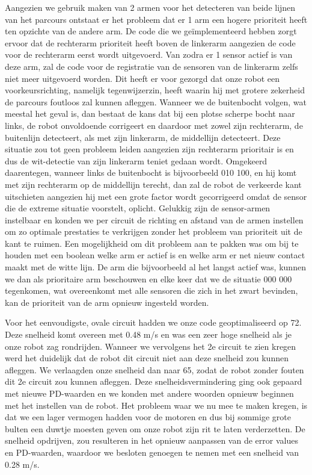 Aangezien we gebruik maken van 2 armen voor het detecteren van beide lijnen van het parcours ontstaat er het probleem dat er 1 arm een hogere prioriteit heeft ten opzichte van de andere arm. De code die we ge\"implementeerd hebben zorgt ervoor dat de rechterarm prioriteit heeft boven de linkerarm aangezien de code voor de rechterarm eerst wordt uitgevoerd. Van zodra er 1 sensor actief is van deze arm, zal de code voor de registratie van de sensoren van de linkerarm zelfs niet meer uitgevoerd worden. Dit heeft er voor gezorgd dat onze robot een voorkeursrichting, namelijk tegenwijzerzin, heeft waarin hij met grotere zekerheid de parcours foutloos zal kunnen afleggen. Wanneer we de buitenbocht volgen, wat meestal het geval is, dan bestaat de kans dat bij een plotse scherpe bocht naar links, de robot onvoldoende corrigeert en daardoor met zowel zijn rechterarm, de buitenlijn detecteert, als met zijn linkerarm, de middellijn detecteert. Deze situatie zou tot geen probleem leiden aangezien zijn rechterarm prioritair is en dus de wit-detectie van zijn linkerarm teniet gedaan wordt. Omgekeerd daarentegen, wanneer links de buitenbocht is bijvoorbeeld 010 100, en hij komt met zijn rechterarm op de middellijn terecht, dan zal de robot de verkeerde kant uitschieten aangezien hij met een grote factor wordt gecorrigeerd omdat de sensor die de extreme situatie voorstelt, oplicht. Gelukkig zijn de sensor-armen instelbaar en konden we per circuit de richting en afstand van de armen instellen om zo optimale prestaties te verkrijgen zonder het probleem van prioriteit uit de kant te ruimen. Een mogelijkheid om dit probleem aan te pakken was om bij te houden met een boolean welke arm er actief is en welke arm er net nieuw contact maakt met de witte lijn. De arm die bijvoorbeeld al het langst actief was, kunnen we dan als prioritaire arm beschouwen en elke keer dat we de situatie 000 000 tegenkomen, wat overeenkomt met alle sensoren die zich in het zwart bevinden, kan de prioriteit van de arm opnieuw ingesteld worden.

Voor het eenvoudigste, ovale circuit hadden we onze code geoptimaliseerd op 72. Deze snelheid komt overeen met 0.48 m/s en was een zeer hoge snelheid als je onze robot zag rondrijden. Wanneer we vervolgens het 2e circuit te zien kregen werd het duidelijk dat de robot dit circuit niet aan deze snelheid zou kunnen afleggen. We verlaagden onze snelheid dan naar 65, zodat de robot zonder fouten dit 2e circuit zou kunnen afleggen. Deze snelheidsvermindering ging ook gepaard met nieuwe PD-waarden en we konden met andere woorden opnieuw beginnen met het instellen van de robot. Het probleem waar we nu mee te maken kregen, is dat we een lager vermogen hadden voor de motoren en dus bij sommige grote bulten een duwtje moesten geven om onze robot zijn rit te laten verderzetten. De snelheid opdrijven, zou resulteren in het opnieuw aanpassen van de error values en PD-waarden, waardoor we besloten genoegen te nemen met een snelheid van 0.28 m/s.


